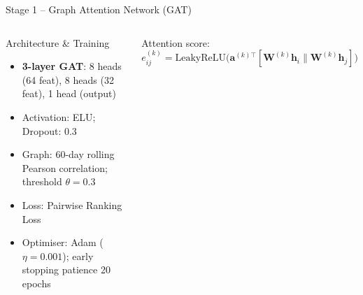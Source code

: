 \documentclass[aspectratio=169,11pt]{beamer}
\begin{document}
	\begin{frame}{Stage 1 -- Graph Attention Network (GAT)}
		\vspace{-10pt}
		\begin{columns}[T]
			\begin{block}{Architecture \& Training}
				\begin{itemize}\setlength\itemsep{3pt}
					\item \textbf{3-layer GAT}: 8 heads (64 feat),
					8 heads (32 feat), 1 head (output)
					\item Activation: ELU; Dropout: 0.3
					\item Graph: 60-day rolling Pearson correlation;
					threshold $\theta=0.3$
					\item Loss: Pairwise Ranking Loss
					\item Optimiser: Adam ($\eta=0.001$);
					early stopping patience 20 epochs
				\end{itemize}
			\end{block}
			{\small Attention score:}
			\[e_{ij}^{(k)} = \text{LeakyReLU}\!\bigl(
			\mathbf{a}^{(k)\top}[\mathbf{W}^{(k)}\mathbf{h}_i
			\| \mathbf{W}^{(k)}\mathbf{h}_j]\bigr)\]
			

\end{columns}
\end{frame}
\end{document}
